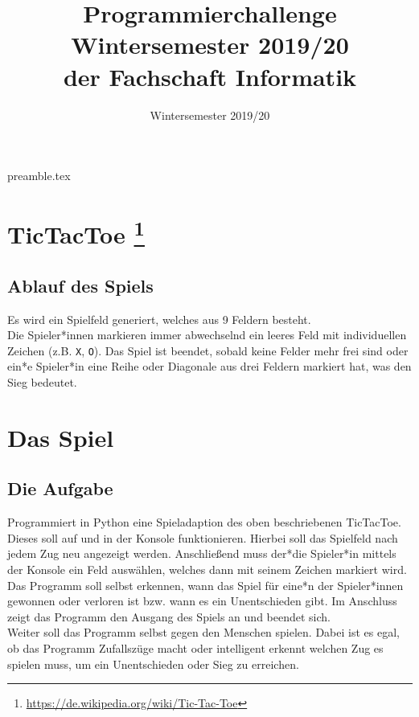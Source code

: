 \RequirePackage{import}
{preamble.tex}
\usepackage[T1]{fontenc}
\usepackage[utf8]{inputenc}
\usepackage[ngerman]{babel}
\usepackage{hyperref}
\usepackage{ifthen}
\usepackage{listings}
\usepackage{graphicx}
\usepackage{multicol}
\usepackage{multirow}

\setlength{\parindent}{0pt}


\title{Programmierchallenge Wintersemester 2019/20 \\ {\small der Fachschaft Informatik}}
\subtitle{Wintersemester 2019/20}
\maketitle

\section*{TicTacToe \footnote[1]{\url{https://de.wikipedia.org/wiki/Tic-Tac-Toe}}}
\subsection*{Ablauf des Spiels}
Es wird ein Spielfeld generiert, welches aus 9 Feldern besteht. \\

Die Spieler*innen markieren immer abwechselnd ein leeres Feld mit individuellen Zeichen (z.B. \texttt{X}, \texttt{O}). Das Spiel ist beendet, sobald keine Felder mehr frei sind oder ein*e Spieler*in eine Reihe oder Diagonale aus drei Feldern markiert hat, was den Sieg bedeutet. \\


\section*{Das Spiel}
\subsection*{Die Aufgabe}
Programmiert in Python eine Spieladaption des oben beschriebenen TicTacToe. Dieses soll auf und in der Konsole funktionieren. Hierbei soll das Spielfeld nach jedem Zug neu angezeigt werden. Anschließend muss der*die Spieler*in mittels der Konsole ein Feld auswählen, welches dann mit seinem Zeichen markiert wird. \\
Das Programm soll selbst erkennen, wann das Spiel für eine*n der Spieler*innen gewonnen oder verloren ist bzw. wann es ein Unentschieden gibt. Im Anschluss zeigt das Programm den Ausgang des Spiels an und beendet sich. \\
Weiter soll das Programm selbst gegen den Menschen spielen. Dabei ist es egal, ob das Programm Zufallszüge macht oder intelligent erkennt welchen Zug es spielen muss, um ein Unentschieden oder Sieg zu erreichen.

